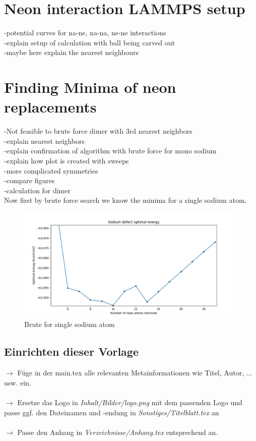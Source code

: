 \chapter{Neon interaction LAMMPS setup}
-potential curves for na-ne, na-na, ne-ne interactions\\
-explain setup of calculation with ball being carved out\\
-maybe here explain the nearest neighbours
\chapter{Finding Minima of neon replacements}
\label{chap:Erstes Kapitel}
-Not feasible to brute force dimer with 3rd nearest neighbors\\
-explain nearest neighbors\\
-explain confirmation of algorithm with brute force for mono sodium\\
-explain how plot is created with sweeps\\
-more complicated symmetries\\
-compare figures\\
-calculation for dimer\\
Now first by brute force search we know the minima for a single sodium atom.

\begin{figure}[h!]
	\centering
	\includegraphics[scale=0.5]{./Inhalt/Bilder/optimal_defect_brute_force.png}
	\caption{Brute for single sodium atom}
	\label{fig:bruteforcesodium}
\end{figure} 





%
%
\section{Einrichten dieser Vorlage}
\label{sec:Einrichten dieser Vorlage}
%
$\rightarrow$ Füge in der main.tex alle relevanten Metainformationen wie Titel, Autor, ... usw. ein.\\\\
%
$\rightarrow$ Ersetze das Logo in \textit{Inhalt/Bilder/logo.png} mit dem passenden Logo und passe ggf. den Dateinamen und -endung in \textit{Sonstiges/Titelblatt.tex} an\\\\
%
$\rightarrow$ Passe den Anhang in \textit{Verzeichnisse/Anhang.tex} entsprechend an.
%
%
